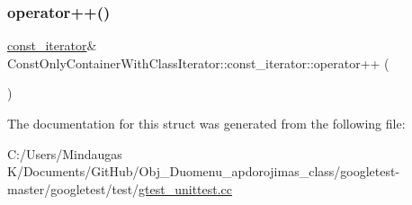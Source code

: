 \mbox{\label{struct_const_only_container_with_class_iterator_1_1const__iterator_a99150bd6377f80d9944b95aa2a5c7805}} 
\subsubsection{\texorpdfstring{operator++()}{operator++()}\hspace{0.1cm}{\footnotesize\ttfamily [2/2]}}
{\footnotesize\ttfamily \mbox{\hyperlink{struct_const_only_container_with_class_iterator_1_1const__iterator}{const\+\_\+iterator}}\& Const\+Only\+Container\+With\+Class\+Iterator\+::const\+\_\+iterator\+::operator++ (\begin{DoxyParamCaption}{ }\end{DoxyParamCaption})}



The documentation for this struct was generated from the following file\+:\begin{DoxyCompactItemize}
\item 
C\+:/\+Users/\+Mindaugas K/\+Documents/\+Git\+Hub/\+Obj\+\_\+\+Duomenu\+\_\+apdorojimas\+\_\+class/googletest-\/master/googletest/test/\mbox{\hyperlink{googletest-master_2googletest_2test_2gtest__unittest_8cc}{gtest\+\_\+unittest.\+cc}}\end{DoxyCompactItemize}

